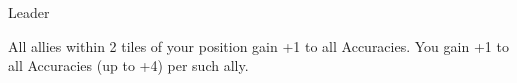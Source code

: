 \begin{monsterboxbg}{Leader}
    \begin{rpg-monsteraction}
    \end{rpg-monsteraction}

    \begin{rpg-monsteraction}
    \end{rpg-monsteraction}


    \begin{rpg-monsteraction}
        All allies within 2 tiles of your position gain +1 to all Accuracies. You gain +1 to all Accuracies (up to +4) per such ally.
    \end{rpg-monsteraction}

\end{monsterboxbg}



